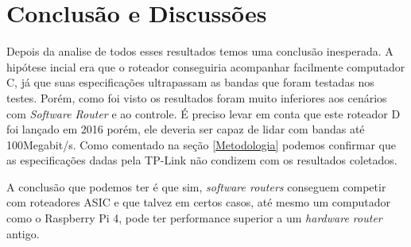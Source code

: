 \section{Conclusão e Discussões}
Depois da analise de todos esses resultados temos uma conclusão inesperada. A hipótese incial era que o roteador conseguiria acompanhar facilmente computador C, já que suas especificações ultrapassam as bandas que foram testadas nos testes. Porém, como foi visto os resultados foram muito inferiores aos cenários com \textit{Software Router} e ao controle. É preciso levar em conta que este roteador D foi lançado em 2016 porém, ele deveria ser capaz de lidar com bandas até 100Megabit/s. Como comentado na seção \ref{Metodologia} podemos confirmar que as especificações dadas pela TP-Link não condizem com os resultados coletados. 

A conclusão que podemos ter é que sim, \textit{software routers} conseguem competir com roteadores \ac{ASIC} e que talvez em certos casos, até mesmo um computador como o Raspberry Pi 4, pode ter performance superior a um \textit{hardware router} antigo. 

